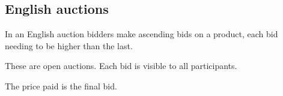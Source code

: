 
\subsection{English auctions}

In an English auction bidders make ascending bids on a product, each bid needing to be higher than the last.

These are open auctions. Each bid is visible to all participants.

The price paid is the final bid.


